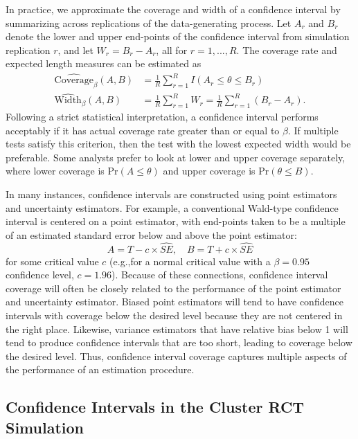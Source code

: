 \documentclass[
]{book}
\newcommand{\Prob}{\text{Pr}}
\begin{document}
In practice, we approximate the coverage and width of a confidence interval by summarizing across replications of the data-generating process.
Let \(A_r\) and \(B_r\) denote the lower and upper end-points of the confidence interval from simulation replication \(r\), and let \(W_r = B_r - A_r\), all for \(r = 1,...,R\).
The coverage rate and expected length measures can be estimated as
\[
\begin{aligned}
\widehat{\text{Coverage}}_\beta(A,B) &= \frac{1}{R}\sum_{r=1}^R I(A_r \leq \theta \leq B_r) \\
\widehat{\text{Width}}_\beta(A,B) &= \frac{1}{R} \sum_{r=1}^R W_r = \frac{1}{R} \sum_{r=1}^R \left(B_r - A_r\right).
\end{aligned}
\label{eq:coverage-width}
\]
Following a strict statistical interpretation, a confidence interval performs acceptably if it has actual coverage rate greater than or equal to \(\beta\).
If multiple tests satisfy this criterion, then the test with the lowest expected width would be preferable. Some analysts prefer to look at lower and upper coverage separately, where lower coverage is \(\Prob(A \leq \theta)\) and upper coverage is \(\Prob(\theta \leq B)\).

In many instances, confidence intervals are constructed using point estimators and
uncertainty estimators.
For example, a conventional Wald-type confidence interval is centered on a point estimator, with end-points taken to be a multiple of an estimated standard error below and above the point estimator:
\[
A = T - c \times \widehat{SE}, \quad B = T + c \times \widehat{SE}
\]
for some critical value \(c\) (e.g.,for a normal critical value with a \(\beta = 0.95\) confidence level, \(c = 1.96\)).
Because of these connections, confidence interval coverage will often be closely related to the performance of the point estimator and uncertainty estimator.
Biased point estimators will tend to have confidence intervals with coverage below the desired level because they are not centered in the right place.
Likewise, variance estimators that have relative bias below 1 will tend to produce confidence intervals that are too short, leading to coverage below the desired level.
Thus, confidence interval coverage captures multiple aspects of the performance of an estimation procedure.

\subsection{Confidence Intervals in the Cluster RCT Simulation}\label{confidence-intervals-in-the-cluster-rct-simulation}
\end{document}
